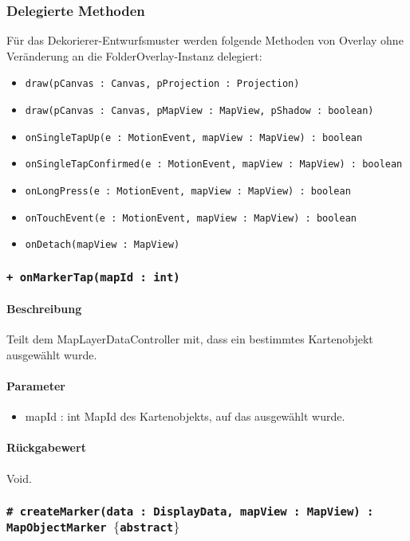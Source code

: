 \subsubsection*{Delegierte Methoden}
Für das Dekorierer-Entwurfsmuster werden folgende Methoden von Overlay ohne Veränderung 
an die FolderOverlay-Instanz delegiert:
\begin{itemize}
    \item \texttt{draw(pCanvas : Canvas, pProjection : Projection)}
    \item \texttt{draw(pCanvas : Canvas, pMapView : MapView, pShadow : boolean)}
    \item \texttt{onSingleTapUp(e : MotionEvent, mapView : MapView) : boolean}
    \item \texttt{onSingleTapConfirmed(e : MotionEvent, mapView : MapView) : boolean}
    \item \texttt{onLongPress(e : MotionEvent, mapView : MapView) : boolean}
    \item \texttt{onTouchEvent(e : MotionEvent, mapView : MapView) : boolean}
    \item \texttt{onDetach(mapView : MapView)}
\end{itemize}

\subsubsection*{\texttt{+ onMarkerTap(mapId : int)}}%
\paragraph*{Beschreibung}
Teilt dem MapLayerDataController mit, dass ein bestimmtes Kartenobjekt ausgewählt wurde.
\paragraph*{Parameter}
\begin{itemize}
    \item mapId : int MapId des Kartenobjekts, auf das ausgewählt wurde.
\end{itemize}
\paragraph*{Rückgabewert}
Void.

\subsubsection*{\texttt{\# createMarker(data : DisplayData, mapView : MapView) : MapObjectMarker $\lbrace$abstract$\rbrace$}}%
